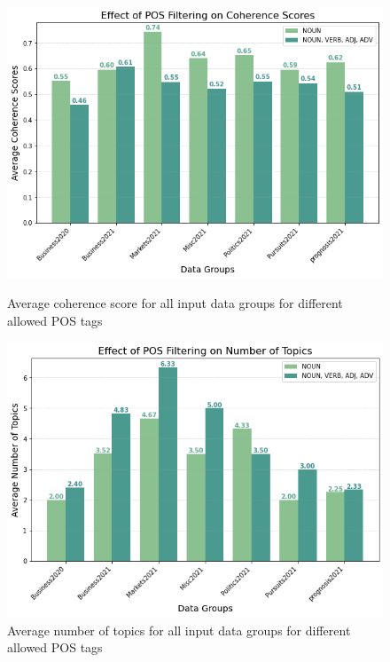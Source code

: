 \begin{figure}[H]
  \centering
    \begin{minipage}[t]{.49\linewidth}
      \centering
      \includegraphics[width=\linewidth]{images/eval/pos_coherence.png}
      \caption{Average coherence score for all input data groups for different allowed POS tags}
      \label{fig:pos_topic}
    \end{minipage}
    \begin{minipage}[t]{.49\linewidth}
      \centering
      \includegraphics[width=\linewidth]{images/eval/topics_pos.png}
      \caption{Average number of topics for all input data groups for different allowed POS tags}
       \label{fig:topics_pos}
    \end{minipage}
  \end{figure}



